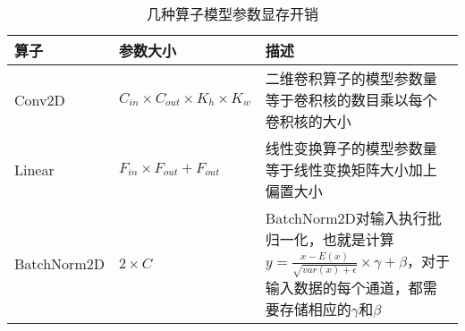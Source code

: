 \begin{table}
	\centering
	\caption{几种算子模型参数显存开销}
	\label{table:operator-mem}
    \begin{tabularx}{\linewidth}{ p{2.4cm} p{3.8cm} X }
        \toprule
        \textbf{算子} & \textbf{参数大小} & \textbf{描述} \\
        \midrule
        Conv2D & $C_{in} \times C_{out} \times K_{h} \times K_{w}$ & 二维卷积算子的模型参数量等于卷积核的数目乘以每个卷积核的大小 \\
        \midrule
        Linear  & $F_{in} \times F_{out} + F_{out}$ & 线性变换算子的模型参数量等于线性变换矩阵大小加上偏置大小 \\
        \midrule
        BatchNorm2D & $2\times C $ & BatchNorm2D对输入执行批归一化，也就是计算$y=\frac{x-E(x)}{\sqrt{var(x)+\epsilon}} \times \gamma + \beta$，对于输入数据的每个通道，都需要存储相应的$\gamma$和$\beta$ \\
        \bottomrule
    \end{tabularx}
\end{table}